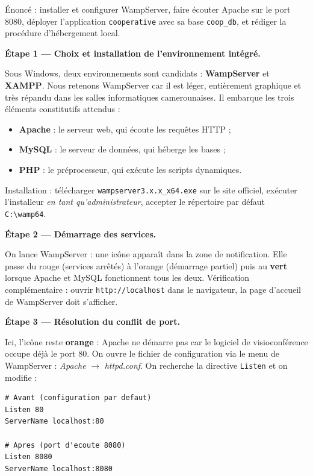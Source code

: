 \documentclass[11pt]{article}
\begin{document}
\begin{exoresolu}
Énoncé : installer et configurer WampServer, faire écouter Apache sur le port 8080, déployer l'application \texttt{cooperative} avec sa base \texttt{coop\_db}, et rédiger la procédure d'hébergement local.

\tcblower

\textbf{Étape 1 — Choix et installation de l'environnement intégré.}

Sous Windows, deux environnements sont candidats : \textbf{WampServer} et \textbf{XAMPP}. Nous retenons WampServer car il est léger, entièrement graphique et très répandu dans les salles informatiques camerounaises. Il embarque les trois éléments constitutifs attendus :
\begin{itemize}
\item \textbf{Apache} : le serveur web, qui écoute les requêtes HTTP ;
\item \textbf{MySQL} : le serveur de données, qui héberge les bases ;
\item \textbf{PHP} : le préprocesseur, qui exécute les scripts dynamiques.
\end{itemize}
Installation : télécharger \texttt{wampserver3.x.x\_x64.exe} sur le site officiel, exécuter l'installeur \emph{en tant qu'administrateur}, accepter le répertoire par défaut \texttt{C:\textbackslash wamp64}.

\textbf{Étape 2 — Démarrage des services.}

On lance WampServer : une icône apparaît dans la zone de notification. Elle passe du rouge (services arrêtés) à l'orange (démarrage partiel) puis au \textbf{vert} lorsque Apache et MySQL fonctionnent tous les deux. Vérification complémentaire : ouvrir \texttt{http://localhost} dans le navigateur, la page d'accueil de WampServer doit s'afficher.

\textbf{Étape 3 — Résolution du conflit de port.}

Ici, l'icône reste \textbf{orange} : Apache ne démarre pas car le logiciel de visioconférence occupe déjà le port 80. On ouvre le fichier de configuration via le menu de WampServer : \emph{Apache} $\rightarrow$ \emph{httpd.conf}. On recherche la directive \texttt{Listen} et on modifie :

\begin{lstlisting}
# Avant (configuration par defaut)
Listen 80
ServerName localhost:80

# Apres (port d'ecoute 8080)
Listen 8080
ServerName localhost:8080
\end{lstlisting}


\end{exoresolu}
\end{document}
